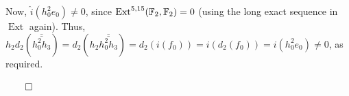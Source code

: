 \documentclass{MetricNotes2023}
\def\bb{\ensuremath\mathbb}
\def\A{\ensuremath{\mathscr{A}_2}}
\DeclareMathOperator{\Ext}{Ext}
\def\done{\begin{flushright}\vspace{-4.35ex}\(\qed\)\end{flushright}}
\def\textcolour{\textcolor}
\begin{document}
\begin{ourproof}
Now, \(\hat i(h_0^2e_0)\neq 0\), since \(\Ext^{5,15}(\bb{F}_2, \bb{F}_2)=0\) (using the long exact sequence in \(\Ext\) again). Thus, \(h_2d_2(\overline{\overline{h_0^2h_3}})= d_2(h_2\overline{\overline{h_0^2h_3}})=
d_2(i(f_0))=i(d_2(f_0))=i(h_0^2e_0)\neq 0\), as required. \done
\end{ourproof}



\end{document}
